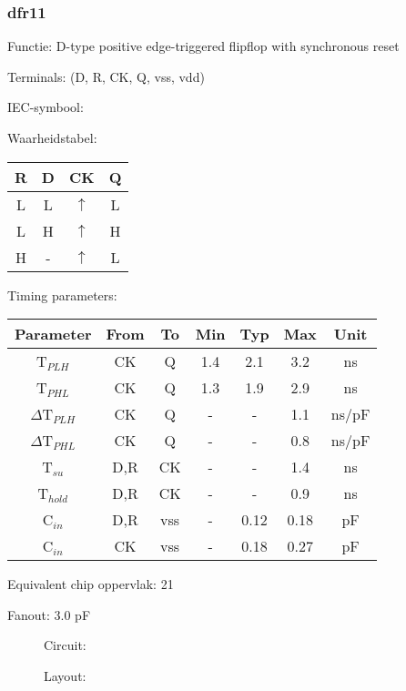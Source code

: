 \subsubsection{dfr11}
Functie: D-type positive edge-triggered flipflop with synchronous reset

Terminals: (D, R, CK, Q, vss, vdd)


IEC-symbool:
\begin{figure}[bth]
\end{figure}

Waarheidstabel:
\begin{table}[bth]
\begin{tabular}{|c|c|c||c|}
\hline
R	&D	&CK		&Q\\
\hline
L	&L	&$\uparrow$	&L\\
L	&H	&$\uparrow$	&H\\
H	&-	&$\uparrow$	&L\\
\hline
\end{tabular}
\vspace{1cm}

Timing parameters:\\

\begin{tabular}{|c|cc|ccc|c|}
\hline
Parameter               &From            &To   &Min	&Typ	&Max    &Unit\\
\hline
T$_{PLH}$               &CK     	&Q     &1.4	&2.1	&3.2    &ns\\
T$_{PHL}$               &CK    		&Q     &1.3	&1.9	&2.9    &ns\\
\hline
$\Delta$T$_{PLH}$       &CK          	&Q	&-	&-	&1.1    &ns/pF\\
$\Delta$T$_{PHL}$       &CK           	&Q    	&-	&-	&0.8    &ns/pF\\
\hline
T$_{su}$		&D,R		&CK	&-	&-	&1.4	&ns\\
T$_{hold}$		&D,R		&CK	&-	&-	&0.9	&ns\\
\hline
C$_{in}$                &D,R	    	&vss    &-	&0.12	&0.18   &pF\\
C$_{in}$                &CK	    	&vss    &-	&0.18	&0.27   &pF\\
\hline
\end{tabular}
\end{table}

Equivalent chip oppervlak: 21

Fanout: 3.0 pF


\begin{figure}[t]
Circuit:\\



Layout:\\

\end{figure}


\clearpage
